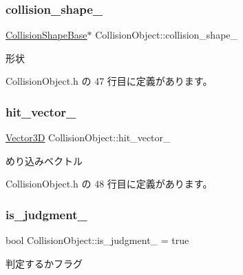 \subsubsection{\texorpdfstring{collision\+\_\+shape\+\_\+}{collision\_shape\_}}
{\footnotesize\ttfamily \mbox{\hyperlink{class_collision_shape_base}{Collision\+Shape\+Base}}$\ast$ Collision\+Object\+::collision\+\_\+shape\+\_\+\hspace{0.3cm}{\ttfamily [private]}}



形状 



 Collision\+Object.\+h の 47 行目に定義があります。

\mbox{\label{class_collision_object_a5fb64c6aaab4606a4e0a1058a844d10e}} 
\subsubsection{\texorpdfstring{hit\+\_\+vector\+\_\+}{hit\_vector\_}}
{\footnotesize\ttfamily \mbox{\hyperlink{class_vector3_d}{Vector3D}} Collision\+Object\+::hit\+\_\+vector\+\_\+\hspace{0.3cm}{\ttfamily [private]}}



めり込みベクトル 



 Collision\+Object.\+h の 48 行目に定義があります。

\mbox{\label{class_collision_object_a0dd29059add616ce619c72ebce6af720}} 
\subsubsection{\texorpdfstring{is\+\_\+judgment\+\_\+}{is\_judgment\_}}
{\footnotesize\ttfamily bool Collision\+Object\+::is\+\_\+judgment\+\_\+ = true\hspace{0.3cm}{\ttfamily [private]}}



判定するかフラグ 



